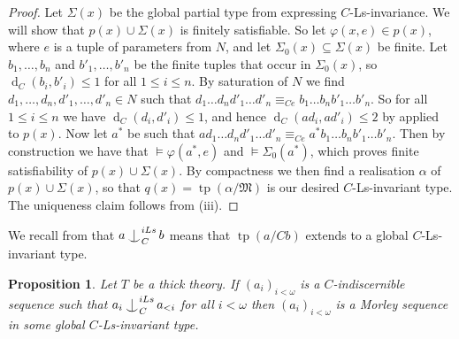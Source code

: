 \documentclass[a4paper, reqno]{amsart}
\newtheorem{proposition}[theorem]{Proposition}
\theoremstyle{definition}
\theoremstyle{repeat}
\newcommand{\MM}{\mathfrak{M}}
\DeclareMathOperator{\tp}{tp}
\renewcommand{\d}{\operatorname{d}}
\renewcommand{\phi}{\varphi}
\def\Ind#1#2{#1\setbox0=\hbox{$#1x$}\kern\wd0\hbox to 0pt{\hss$#1\mid$\hss}
\lower.9\ht0\hbox to 0pt{\hss$#1\smile$\hss}\kern\wd0}
\def\ind{\mathop{\mathpalette\Ind{}}}
\begin{document}
\begin{proof}
Let $\Sigma(x)$ be the global partial type from  expressing $C$-Ls-invariance. We will show that $p(x) \cup \Sigma(x)$ is finitely satisfiable. So let $\phi(x, e) \in p(x)$, where $e$ is a tuple of parameters from $N$, and let $\Sigma_0(x) \subseteq \Sigma(x)$ be finite. Let $b_1, \ldots, b_n$ and $b'_1, \ldots, b'_n$ be the finite tuples that occur in $\Sigma_0(x)$, so $\d_C(b_i, b'_i) \leq 1$ for all $1 \leq i \leq n$. By saturation of $N$ we find $d_1, \ldots, d_n, d'_1, \ldots, d'_n \in N$ such that $d_1 \ldots d_n d'_1 \ldots d'_n \equiv_{Ce} b_1 \ldots b_n b'_1 \ldots b'_n$. So for all $1 \leq i \leq n$ we have $\d_C(d_i, d'_i) \leq 1$, and hence $\d_C(a d_i, a d'_i) \leq 2$ by  applied to $p(x)$. Now let $a^*$ be such that $a d_1 \ldots d_n d'_1 \ldots d'_n \equiv_{Ce} a^* b_1 \ldots b_n b'_1 \ldots b'_n$. Then by construction we have that $\models \phi(a^*, e)$ and $\models \Sigma_0(a^*)$, which proves finite satisfiability of $p(x) \cup \Sigma(x)$. By compactness we then find a realisation $\alpha$ of $p(x) \cup \Sigma(x)$, so that $q(x) = \tp(\alpha/\MM)$ is our desired $C$-Ls-invariant type. The uniqueness claim follows from (iii).
\end{proof}
We recall from \cite[Definition 3.12]{dobrowolski_kim-independence_2022} that $a \ind^{iLs}_C b$ means that $\tp(a/Cb)$ extends to a global $C$-Ls-invariant type.
\begin{proposition}
Let $T$ be a thick theory. If $(a_i)_{i < \omega}$ is a $C$-indiscernible sequence such that $a_i \ind^{iLs}_C a_{<i}$ for all $i < \omega$ then $(a_i)_{i < \omega}$ is a Morley sequence in some global $C$-Ls-invariant type.
\end{proposition}
\end{document}
